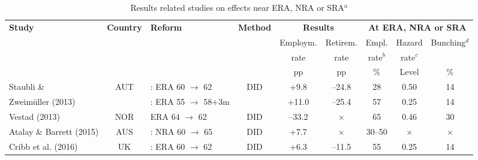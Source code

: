 \documentclass[12pt,a4paper]{article}
\begin{document}
\begin{table}[!t]
\begin{adjustwidth}{-0.75in}{-0.5in}	
		\scriptsize
		\caption{Results related studies on effects near ERA, NRA or SRA$^a$}
		\label{comparison}
		\begin{tabular}{lclc cc ccc}		
		
			\toprule
			
			\textbf{Study} & \textbf{Country} & \multicolumn{1}{l}{\textbf{Reform}} & \multicolumn{1}{c}{\textbf{Method}}   &  \multicolumn{2}{c}{\textbf{Results}}        &  \multicolumn{3}{c}{\textbf{At ERA, NRA or SRA}}                           \\	
			&  &  &               & Employm. & Retirem. &  Empl. & Hazard & Bunching$^d$ \\
			&              &               &              & rate          & rate                & rate$^b$              & rate$^c$     &                  \\
			&              &               &              & pp            &  pp               &  \%             &  Level       & \%           \\
			\midrule
			
			Staubli \& & 
			AUT & \male: ERA 60 $\rightarrow$ 62 &  
			DID  &
			+9.8 & --24.8 &
			28   & 0.50  & 14 \\ 
			
			Zweimüller (2013) && \female: ERA 55 $\rightarrow$ 58+3m & &
			+11.0 & --25.4  & 
			57  & 0.25  & 14 \\ 
			
			Vestad (2013) & NOR & ERA 64 $\rightarrow$ 62 & 
			DID & 
			--33.2 & $\times$ &  
			65 & 0.46 & 30 \\

			Atalay \& Barrett (2015) & AUS & \female: NRA 60 $\rightarrow$ 65 & 
			DID & 
			+7.7 & $\times$ &  
			30--50 & $\times$ & $\times$ \\

			Cribb et al. (2016) &
			UK & \female: ERA 60 $\rightarrow$ 62 &  
			DID  &
			+6.3 & --11.5 &
			55 & 0.25 & 14 \\ 
						

\end{tabular}
\end{adjustwidth}
\end{table}
\end{document}

